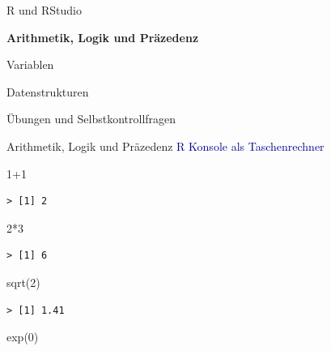 \documentclass[
  8pt,
  ignorenonframetext,
]{beamer}
\newenvironment{Shaded}{\begin{snugshade}}{\end{snugshade}}
\newcommand{\DecValTok}[1]{\textcolor[rgb]{0.00,0.00,0.81}{#1}}
\newcommand{\FunctionTok}[1]{\textcolor[rgb]{0.00,0.00,0.00}{#1}}
\newcommand{\NormalTok}[1]{#1}
\newcommand{\SpecialCharTok}[1]{\textcolor[rgb]{0.00,0.00,0.00}{#1}}
\begin{document}
\begin{frame}{}
\protect\hypertarget{section-4}{}
\large
\vfill
{}

R und RStudio

\textbf{Arithmetik, Logik und Präzedenz}

Variablen

Datenstrukturen

Übungen und Selbstkontrollfragen
\end{frame}

\begin{frame}[fragile]{Arithmetik, Logik und Präzedenz}
\protect\hypertarget{arithmetik-logik-und-pruxe4zedenz}{}
\textcolor{darkblue}{R Konsole als Taschenrechner} \footnotesize
\vspace{1mm}

\begin{Shaded}
\begin{Highlighting}[]
\DecValTok{1}\SpecialCharTok{+}\DecValTok{1}
\end{Highlighting}
\end{Shaded}

\begin{verbatim}
> [1] 2
\end{verbatim}

\begin{Shaded}
\begin{Highlighting}[]
\DecValTok{2}\SpecialCharTok{*}\DecValTok{3}
\end{Highlighting}
\end{Shaded}

\begin{verbatim}
> [1] 6
\end{verbatim}

\begin{Shaded}
\begin{Highlighting}[]
\FunctionTok{sqrt}\NormalTok{(}\DecValTok{2}\NormalTok{)}
\end{Highlighting}
\end{Shaded}

\begin{verbatim}
> [1] 1.41
\end{verbatim}

\begin{Shaded}
\begin{Highlighting}[]
\FunctionTok{exp}\NormalTok{(}\DecValTok{0}\NormalTok{)}
\end{Highlighting}
\end{Shaded}


\end{frame}
\end{document}
